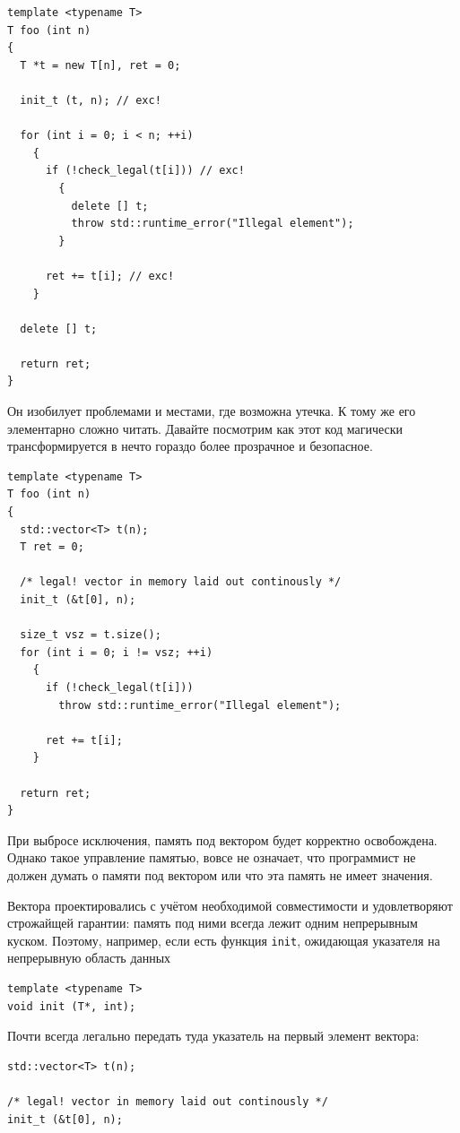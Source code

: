 \documentclass[a4paper,12pt,oneside]{book}
\begin{document}
\begin{lstlisting}
template <typename T>
T foo (int n)
{
  T *t = new T[n], ret = 0;

  init_t (t, n); // exc!
  
  for (int i = 0; i < n; ++i)
    {
      if (!check_legal(t[i])) // exc!
        {
          delete [] t;
          throw std::runtime_error("Illegal element");
        }

      ret += t[i]; // exc!
    }

  delete [] t;

  return ret;
}
\end{lstlisting}

Он изобилует проблемами и местами, где возможна утечка. К тому же его элементарно сложно читать. Давайте посмотрим как этот код магически трансформируется в нечто гораздо более прозрачное и безопасное.

\begin{lstlisting}
template <typename T>
T foo (int n)
{
  std::vector<T> t(n);
  T ret = 0;

  /* legal! vector in memory laid out continously */
  init_t (&t[0], n); 

  size_t vsz = t.size();
  for (int i = 0; i != vsz; ++i)
    {
      if (!check_legal(t[i]))
        throw std::runtime_error("Illegal element");

      ret += t[i];
    }

  return ret;
}
\end{lstlisting}

При выбросе исключения, память под вектором будет корректно освобождена. Однако такое управление памятью, вовсе не означает, что программист не должен думать о памяти под вектором или что эта память не имеет значения.

Вектора проектировались с учётом необходимой совместимости и удовлетворяют строжайщей гарантии: память под ними всегда лежит одним непрерывным куском. Поэтому, например, если есть функция \lstinline!init!, ожидающая указателя на непрерывную область данных

\begin{lstlisting}
template <typename T>
void init (T*, int);
\end{lstlisting}

Почти всегда легально передать туда указатель на первый элемент вектора:

\begin{lstlisting}
std::vector<T> t(n);

/* legal! vector in memory laid out continously */
init_t (&t[0], n);
\end{lstlisting}
\end{document}
